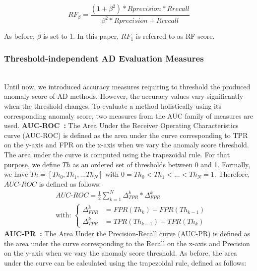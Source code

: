 \begin{equation}
RF_{\beta} = \frac{(1+\beta^2)*Rprecision*Rrecall}{\beta^2*Rprecision+Rrecall}
\end{equation}

\noindent As before, $\beta$ is set to 1. In this paper, $RF_1$ is referred to as RF-score.

\subsubsection{Threshold-independent AD Evaluation Measures} \hfill\\
Until now, we introduced accuracy measures requiring to threshold the produced anomaly score of AD methods. However, the accuracy values vary significantly when the threshold changes. To evaluate a method holistically using its corresponding anomaly score, two measures from the AUC family of measures are used.
\newline \textbf{AUC-ROC~\cite{FAWCETT2006861}: } The Area Under the Receiver Operating Characteristics curve (AUC-ROC) is defined as the area under the curve corresponding to TPR on the y-axis and FPR on the x-axis when we vary the anomaly score threshold. The area under the curve is computed using the trapezoidal rule. For that purpose, we define $Th$ as an ordered set of thresholds between 0 and 1. Formally, we have $Th=[Th_0,Th_1,...Th_N]$ with $0=Th_0<Th_1<...<Th_N=1$. Therefore, $AUC\text{-}ROC$ is defined as follows:
\begin{equation}
\begin{split}
&AUC\text{-}ROC = \frac{1}{2}\sum_{k=1}^{N} \Delta^{k}_{TPR}*\Delta^{k}_{FPR}\\
&\text{with: } \left.
\begin{cases}
\Delta^{k}_{FPR} &= FPR(Th_{k})-FPR(Th_{k-1})\\
\Delta^{k}_{TPR} &= TPR(Th_{k-1})+TPR(Th_{k})
\end{cases}
\right. 
\end{split}
\label{equAUCROC}
\end{equation}
\newline \textbf{AUC-PR~\cite{10.1145/1143844.1143874}: } The Area Under the Precision-Recall curve (AUC-PR) is defined as the area under the curve corresponding to the Recall on the x-axis and Precision on the y-axis when we vary the anomaly score threshold. 
As before, the area under the curve can be calculated using the trapezoidal rule, defined as follows:

